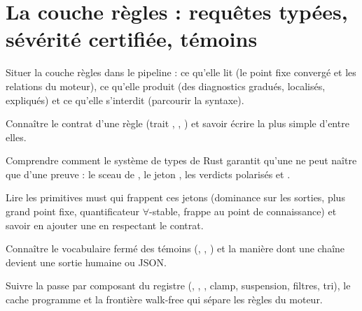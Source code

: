 \chapter{La couche règles : requêtes typées, sévérité certifiée, témoins}
\label{chap:api-regles}

\begin{objectifs}
  \item Situer la couche règles dans le pipeline : ce qu'elle lit (le point fixe convergé et les relations du moteur), ce qu'elle produit (des diagnostics gradués, localisés, expliqués) et ce qu'elle s'interdit (parcourir la syntaxe).
  \item Connaître le contrat d'une règle (trait , , ) et savoir écrire la plus simple d'entre elles.
  \item Comprendre comment le système de types de Rust garantit qu'une \Error{} ne peut naître que d'une preuve : le sceau de , le jeton , les verdicts polarisés  et .
  \item Lire les primitives must qui frappent ces jetons (dominance sur les sorties, plus grand point fixe, quantificateur $\forall$-stable, frappe au point de connaissance) et savoir en ajouter une en respectant le contrat.
  \item Connaître le vocabulaire fermé des témoins (, , ) et la manière dont une chaîne devient une sortie humaine ou JSON.
  \item Suivre la passe par composant du registre (, , , clamp, suspension, filtres, tri), le cache programme et la frontière \og walk-free\fg{} qui sépare les règles du moteur.
\end{objectifs}


